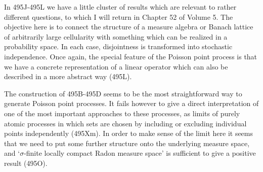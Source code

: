 {In 495J-495L we have a little cluster of results which are relevant to
rather different questions, to which I will return in Chapter 52 of
Volume 5.   %
The objective here is to connect the structure of a measure
algebra or Banach lattice of arbitrarily large cellularity with
something which can be realized in a probability space.   In each case,
disjointness is transformed into stochastic independence.
Once again, the special feature of the Poisson point process is that we
have a concrete representation of a linear operator which can also be
described in a more abstract way (495L).

The construction of 495B-495D seems to be the most straightforward way
to generate Poisson point processes.   It fails however to give a direct
interpretation of one of the most important approaches to these
processes, as limits of purely atomic processes in which sets are chosen
by including or excluding individual points independently
(495Xm).   In order to make sense of the limit here it seems that
we need to put some further structure onto the underlying measure space,
and `$\sigma$-finite locally compact Radon measure space' is sufficient
to give a positive result (495O).

}%

\discrpage

